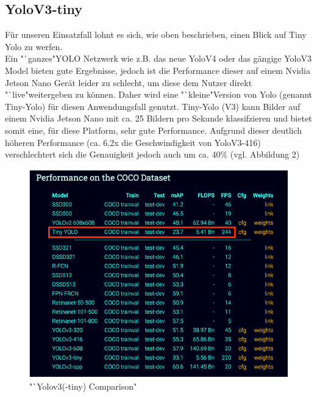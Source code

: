 \documentclass[a4paper,oneside,12pt]{report}
\begin{document}
\begin{onehalfspace}
		\subsection*{YoloV3-tiny}
		Für unseren Einsatzfall lohnt es sich, wie oben beschrieben, einen Blick auf Tiny Yolo zu werfen. \\
		Ein "`ganzes"\space YOLO Netzwerk wie z.B. das neue YoloV4 oder das gängige YoloV3 Model bieten gute Ergebnisse, jedoch ist die Performance dieser auf einem Nvidia Jetson Nano Gerät leider zu schlecht, um diese dem Nutzer direkt "`live"\space weitergeben zu können.
		Daher wird eine "`kleine"\space Version von Yolo (genannt Tiny-Yolo) für diesen Anwendungsfall genutzt. Tiny-Yolo (V3) kann Bilder auf einem Nvidia Jetson Nano mit ca. 25 Bildern pro Sekunde klassifzieren und bietet somit eine, für diese Platform, sehr gute Performance.\clearpage
		Aufgrund dieser deutlich höheren Performance (ca. 6,2x die Geschwindigkeit von YoloV3-416) verschlechtert sich die Genauigkeit jedoch auch um ca. 40\% (vgl. Abbildung 2)\\
		\begin{figure}[h!]
			\includegraphics[scale=0.7]{YoloV3-tiny.png}
			\caption{"`Yolov3(-tiny) Comparison"}
			\label{fig:yolov3-tiny}
		\end{figure}
	\end{onehalfspace}
\end{document}
